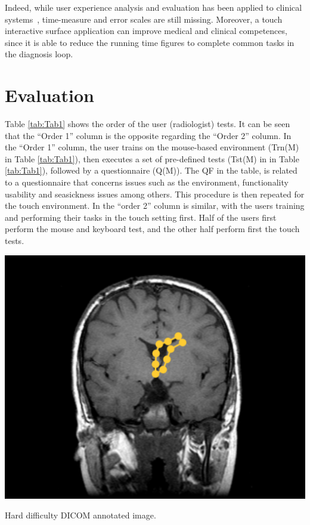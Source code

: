 \documentclass[sigchi-a, authorversion]{acmart}
\begin{document}
Indeed, while user experience analysis and evaluation has been applied to clinical systems~\cite{crisan2013optimization},  time-measure and error scales are still missing. Moreover, a touch interactive surface application can improve medical and clinical competences, since it is able to reduce the running time figures to complete common tasks in the diagnosis loop.

\section{Evaluation}

Table \ref{tab:Tab1} shows the order of the user (radiologist) tests. It can be seen that the ``Order 1'' column is the opposite regarding the ``Order 2'' column. In the ``Order 1'' column, the user trains on the mouse-based environment (Trn(M) in Table \ref{tab:Tab1}), then executes a set of pre-defined tests (Tst(M) in in Table \ref{tab:Tab1}), followed by a questionnaire (Q(M)). The QF in the table, is related to a questionnaire that  concerns issues such as the environment, functionality usability and seasickness issues among others. 
This procedure is then repeated for the touch environment. 
In the ``order 2'' column is similar, with the users training and performing their tasks in the touch setting first. Half of the users first perform the mouse and keyboard test, and the other half perform first the touch tests.

\begin{marginfigure}
\includegraphics[width=\marginparwidth]{screen4.png}
\caption{Hard difficulty DICOM annotated image.}
\label{fig:Fig6}
\end{marginfigure}
\end{document}
